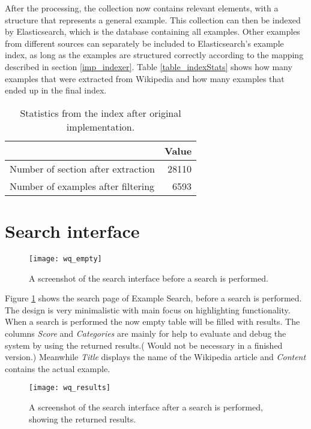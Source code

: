 After the processing, the collection now contains relevant elements, with a structure that represents a general example. This collection can then be indexed by Elasticsearch, which is the database containing all examples. Other examples from different sources can separately be included to Elasticsearch's example index, as long as the examples are structured correctly according to the mapping described in section \ref{imp_indexer}. Table \ref{table_indexStats} shows how many examples that were extracted from Wikipedia and how many examples that ended up in the final index.


\begin{table}[H]
\centering
\begin{tabular} {|| p{15em} | r ||} 
 \hline
  & Value \\ [0.5ex] 
 \hline
Number of section after extraction & 28110 \\
Number of examples after filtering & 6593 \\
 \hline
\end{tabular}
\caption{Statistics from the index after original implementation.}
\label{table:indexStats}
\end{table}

\section{Search interface} \label{5:interface}

\begin{figure}[H] 
\caption{A screenshot of the search interface before a search is performed.}
\centering
\texttt{[image: wq\_empty]}
\label{fig:wq_empty}
\end{figure}

Figure \ref{fig:wq_empty} shows the search page of Example Search, before a search is performed. The design is very minimalistic with main focus on highlighting functionality. When a search is performed the now empty table will be filled with results. The columns \textit{Score} and \textit{Categories} are mainly for help to evaluate and debug the system by using the returned results.( Would not be necessary in a finished version.) Meanwhile \textit{Title} displays the name of the Wikipedia article and \textit{Content} contains the actual example.


\begin{figure}[H] 
\caption{A screenshot of the search interface after a search is performed, showing the returned results.}
\texttt{[image: wq\_results]}
\label{fig:wq_results}
\end{figure}

